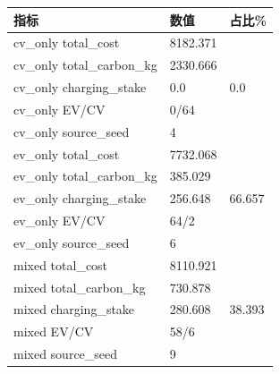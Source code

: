 \begin{tabular}{@{}lll@{}}
\toprule
指标 & 数值 & 占比\%\\
\midrule
cv\_only total\_cost & 8182.371 & \\
cv\_only total\_carbon\_kg & 2330.666 & \\
cv\_only charging\_stake & 0.0 & 0.0\\
cv\_only EV/CV & 0/64 & \\
cv\_only source\_seed & 4 & \\
ev\_only total\_cost & 7732.068 & \\
ev\_only total\_carbon\_kg & 385.029 & \\
ev\_only charging\_stake & 256.648 & 66.657\\
ev\_only EV/CV & 64/2 & \\
ev\_only source\_seed & 6 & \\
mixed total\_cost & 8110.921 & \\
mixed total\_carbon\_kg & 730.878 & \\
mixed charging\_stake & 280.608 & 38.393\\
mixed EV/CV & 58/6 & \\
mixed source\_seed & 9 & \\
\bottomrule
\end{tabular}
